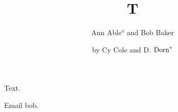 
\title{T}
\author{Ann Able$^{a}$ and Bob Baker\cite{bb}}
\address{Univ X, City}
\author{by Cy Cole and D. ${\rm Dorn}^{*}$}
\address{Univ Y, Town}
\maketitle
Text.
\begin{references}
 Email bob.
\end{references}

